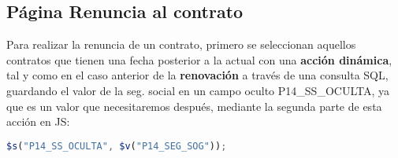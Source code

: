 \subsection{Página Renuncia al contrato}
Para realizar la renuncia de un contrato, primero se seleccionan aquellos contratos que tienen una fecha posterior a la actual con una \textbf{acción dinámica}, tal y como en el caso anterior de la \textbf{renovación} a través de una consulta \acrshort{SQL}, guardando el valor de la seg. social en un campo oculto P14\_SS\_OCULTA, ya que es un valor que necesitaremos después, mediante la segunda parte de esta acción en \acrshort{JS}:
\begin{lstlisting}[language=JavaScript, caption={Guarda seguridad social en campo oculto}]
	$s("P14_SS_OCULTA", $v("P14_SEG_SOG"));
\end{lstlisting}

